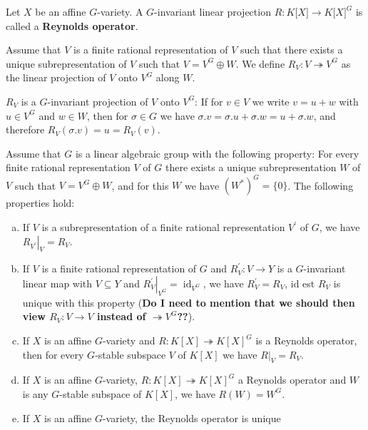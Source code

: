 \begin{definition}
  Let $ X $ be an affine $G$-variety.
  A $ G $-invariant linear projection $R \colon K\lbrack X \rbrack \longrightarrow K\lbrack X \rbrack^G $ is called a \textbf{Reynolds operator}.
\end{definition}

\begin{definition}
  Assume that $V$ is a finite rational representation of $V$ such that there exists a unique subrepresentation of $V$ such that $V = V^G \oplus W$.
 We define $R_V \colon V \twoheadrightarrow V^G$ as the linear projection of $V$ onto $V^G$ along $W$.
\end{definition}

\begin{remark}
  $R_V$ is a $G$-invariant projection of $V$ onto $V^G$:
  If for $v \in V$ we write $v = u + w$ with $u \in V^G$ and $w \in W$, then for $\sigma \in G$ we have $\sigma.v = \sigma.u + \sigma.w = u + \sigma.w$, and therefore $R_V(\sigma.v) = u = R_V(v)$.
\end{remark}

\begin{lemma}\label{lamm}
  Assume that $G$ is a linear algebraic group with the following property:
  For every finite rational representation $V$ of $G$ there exists a unique subrepresentation $W$ of $V$ such that $V = V^G \oplus W$, and for this $W$ we have $(W^\ast)^G = \{0\}$.
  The following properties hold:
  \begin{enumerate}[(a)]
  \item If $V$ is a subrepresentation of a finite rational representation $V^\prime$ of $G$, we have $\left. R_{V^\prime} \right|_V = R_V$.
  \item If $V$ is a finite rational representation of $G$ and $R^\prime_V \colon V \longrightarrow Y$ is a $G$-invariant linear map with $V \subseteq Y$ and $ \left. R^\prime_V \right|_{V^G} = \operatorname{id}_{V^G}$, we have $R^\prime_V = R_V$, id est $R_V$ is unique with this property (\textbf{Do I need to mention that we should then view $R_V \colon V \longrightarrow V$ instead of $ \twoheadrightarrow V^G$??}).
  \item If $X$ is an affine $G$-variety and $R \colon K[X] \twoheadrightarrow K[X]^G$ is a Reynolds operator, then for every $G$-stable subspace $V$ of $K[X]$ we have $\left. R \right|_V = R_V$.
  \item If $X$ is an affine $G$-variety, $R \colon K[X] \twoheadrightarrow K[X]^G$ a Reynolds operator and $W$ is any $G$-stable subspace of $K[X]$, we have $R(W) = W^G$.
  \item If $X$ is an affine $G$-variety, the Reynolds operator is unique
  \end{enumerate}
\end{lemma}

